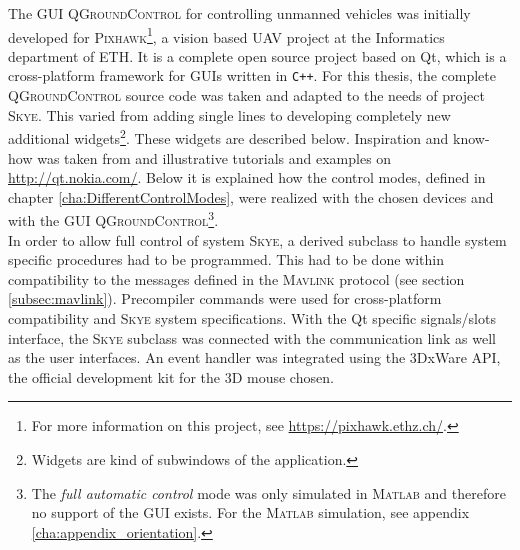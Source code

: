 The GUI \textsc{QGroundControl} for controlling unmanned vehicles was initially developed for \textsc{Pixhawk}\footnote{For more information on this project, see \url{https://pixhawk.ethz.ch/}.}, a vision based UAV project at the Informatics department of \textsc{ETH}. It is a complete open source project based on Qt, which is a cross-platform framework for GUIs written in \verb!C++!. For this thesis, the complete \textsc{QGroundControl} source code was taken and adapted to the needs of project \textsc{Skye}. This varied from adding single lines to developing completely new additional widgets\footnote{Widgets are kind of subwindows of the application.}. These widgets are described below. Inspiration and know-how was taken from \cite{blanchette} and illustrative tutorials and examples on \url{http://qt.nokia.com/}. Below it is explained how the control modes, defined in chapter \ref{cha:DifferentControlModes}, were realized with the chosen devices and with the GUI \textsc{QGroundControl}\footnote{The \textit{full automatic control} mode was only simulated in \textsc{Matlab} and therefore no support of the GUI exists. For the \textsc{Matlab} simulation, see appendix \ref{cha:appendix_orientation}.}. 
\\
In order to allow full control of system \textsc{Skye}, a derived subclass to handle system specific procedures had to be programmed. 
This had to be done within compatibility to the messages defined in the \textsc{Mavlink} protocol (see section \ref{subsec:mavlink}). Precompiler commands were used for cross-platform compatibility and \textsc{Skye} system specifications. 
With the Qt specific signals/slots interface, the \textsc{Skye} subclass was connected with the communication link as well as the user interfaces. 
An event handler was integrated using the 3DxWare API, the official development kit for the 3D mouse chosen.

